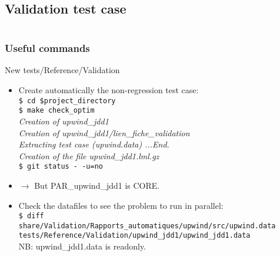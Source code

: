 \documentclass[10pt, hyperref={unicode=true,pdfusetitle, bookmarks=true,bookmarksnumbered=false,bookmarksopen=false, breaklinks=false,pdfborder={0 0 1},backref=true,colorlinks=true,linkcolor=darkblue,pageanchor, urlcolor=darkblue}]{beamer}
\begin{document}
\subsection{{\bf{Validation test case}}}
\begin{frame}
\begin{columns}[c] 
\tableofcontents[sections={1-3},currentsection, currentsubsection]
\tableofcontents[sections={4-8},currentsection, currentsubsection]
\end{columns}
\end{frame}
\begin{frame}
\frametitle{Useful commands}
\begin{block}{New tests/Reference/Validation}

\begin{itemize}
\item Create automatically the non-regression test case:\\
\texttt{\$ cd \$project\_directory}\\
\texttt{\$ make check\_optim}\\
\textit{\hspace{0.1cm} Creation of upwind\_jdd1}\\
\textit{\hspace{0.1cm} Creation of upwind\_jdd1/lien\_fiche\_validation}\\
\textit{\hspace{0.1cm} Extracting test case (upwind.data) ...End.}\\
\textit{\hspace{0.1cm} Creation of the file upwind\_jdd1.lml.gz}\\
\texttt{\$ git status -\,-u=no}\\
\item $\rightarrow$ But PAR\_upwind\_jdd1 is CORE.\\
\item Check the datafiles to see the problem to run in parallel:\\
\texttt{\$ diff share/Validation/Rapports\_automatiques/upwind/src/upwind.data tests/Reference/Validation/upwind\_jdd1/upwind\_jdd1.data}\\
NB: upwind\_jdd1.data is readonly.\\
\end{itemize}

\end{block}
\end{frame}
\end{document}
